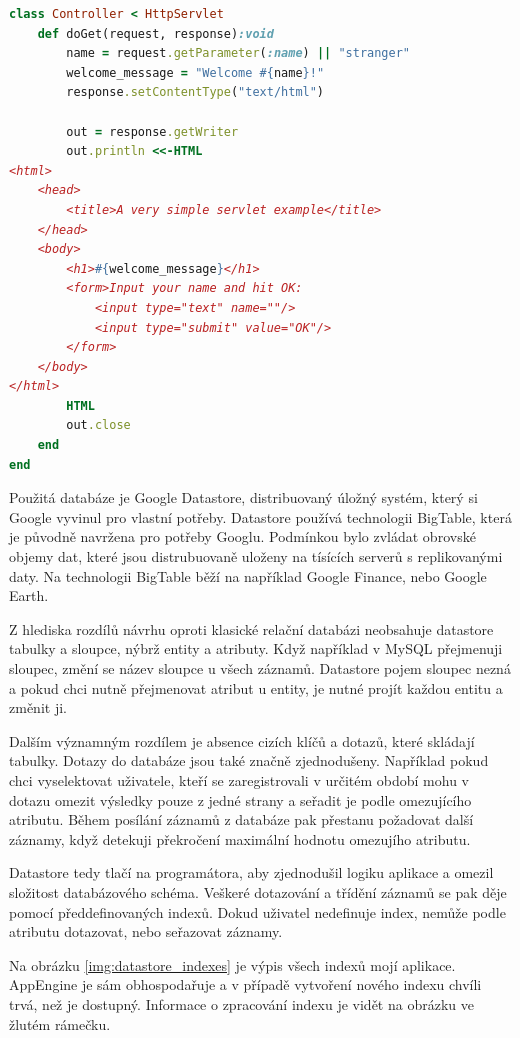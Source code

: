 \documentclass[bc,male,java,dept456]{diploma}						%
\begin{document}
\begin{lstlisting}[label=src:fib_mirah,caption=Hello World servlet v Mirah,language=Ruby]
class Controller < HttpServlet
	def doGet(request, response):void
		name = request.getParameter(:name) || "stranger"
		welcome_message = "Welcome #{name}!"
		response.setContentType("text/html")
 
		out = response.getWriter
		out.println <<-HTML
<html>
	<head>
		<title>A very simple servlet example</title>
	</head>
	<body>
		<h1>#{welcome_message}</h1>
		<form>Input your name and hit OK:
			<input type="text" name=""/>
			<input type="submit" value="OK"/>
		</form>
	</body>
</html>
		HTML
		out.close
	end
end
\end{lstlisting}

Použitá databáze je Google Datastore, distribuovaný úložný systém, který si Google vyvinul pro vlastní potřeby. Datastore používá technologii BigTable, která je původně navržena pro potřeby Googlu. Podmínkou bylo zvládat obrovské objemy dat, které jsou distrubuovaně uloženy na tísících serverů s replikovanými daty. Na technologii BigTable běží na například Google Finance, nebo Google Earth.

Z hlediska rozdílů návrhu oproti klasické relační databázi neobsahuje datastore tabulky a sloupce, nýbrž entity a atributy. Když například v MySQL přejmenuji sloupec, změní se název sloupce u všech záznamů. Datastore pojem sloupec nezná a pokud chci nutně přejmenovat atribut u entity, je nutné projít každou entitu a změnit ji.

Dalším významným rozdílem je absence cizích klíčů a dotazů, které skládají tabulky. Dotazy do databáze jsou také značně zjednodušeny. Například pokud chci vyselektovat uživatele, kteří se zaregistrovali v určitém období mohu v dotazu omezit výsledky pouze z jedné strany a seřadit je podle omezujícího atributu. Během posílání záznamů z databáze pak přestanu požadovat další záznamy, když detekuji překročení maximální hodnotu omezujího atributu.

Datastore tedy tlačí na programátora, aby zjednodušil logiku aplikace a omezil slo\-ži\-tost databázového schéma. Veškeré dotazování a třídění záznamů se pak děje pomocí před\-de\-fi\-no\-va\-ných indexů. Dokud uživatel nedefinuje index, nemůže podle atributu dotazovat, nebo seřazovat záznamy.

Na obrázku \ref{img:datastore_indexes} je výpis všech indexů mojí aplikace. AppEngine je sám obhospodařuje a v případě vytvoření nového indexu chvíli trvá, než je dostupný. Informace o zpracování indexu je vidět na obrázku ve žlutém rámečku.
\end{document}
